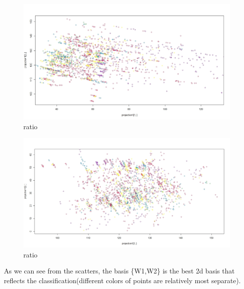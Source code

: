 \documentclass{article}
\begin{document}
  \begin{figure}[H]
  \centering
  \includegraphics[width=1.0\textwidth]{scatter13.jpg}
  \caption{ratio}\label{}
  \end{figure}
  \begin{figure}[H]
  \centering
  \includegraphics[width=1.0\textwidth]{scatter23.jpg}
  \caption{ratio}\label{}
  \end{figure}
As we can see from the scatters, the basis \{W1,W2\} is the best 2d basis that reflects the classification(different colors of points are relatively most separate).
\end{document}
